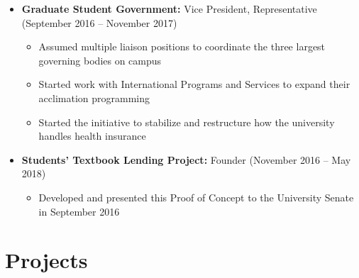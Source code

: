 \documentclass[10pt,a4paper,sans]{moderncv}        %
\begin{document}
\begin{itemize}

\item \textbf{Graduate Student Government:} Vice President, Representative (September 2016 -- November 2017)
\begin{itemize}
	\item Assumed multiple liaison positions to coordinate the three largest governing bodies on campus
	\item Started work with International Programs and Services to expand their acclimation programming
	\item Started the initiative to stabilize and restructure how the university handles health insurance
\end{itemize}

\vspace{6pt}

\item \textbf{Students' Textbook Lending Project:} Founder (November 2016 -- May 2018)
\begin{itemize}
	\item Developed and presented this Proof of Concept to the University Senate in September 2016
\end{itemize}

\end{itemize}


\vspace{2pt}

\section{Projects}

\vspace{5pt}
\end{document}
